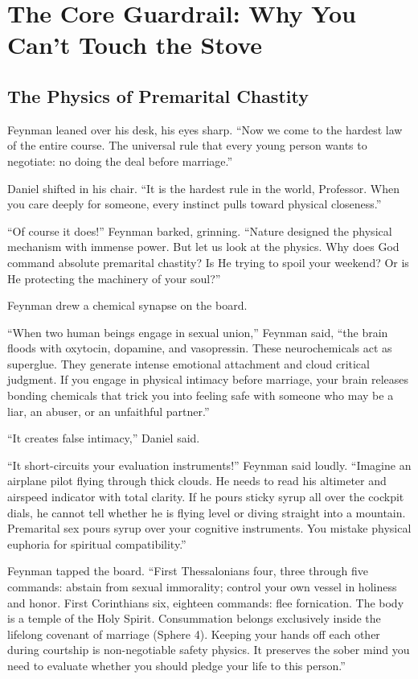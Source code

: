 \documentclass[11pt]{report}
\begin{document}
\chapter{The Core Guardrail: Why You Can't Touch the Stove}

\section{The Physics of Premarital Chastity}
Feynman leaned over his desk, his eyes sharp. ``Now we come to the hardest law of the entire course. The universal rule that every young person wants to negotiate: no doing the deal before marriage.''

Daniel shifted in his chair. ``It is the hardest rule in the world, Professor. When you care deeply for someone, every instinct pulls toward physical closeness.''

``Of course it does!'' Feynman barked, grinning. ``Nature designed the physical mechanism with immense power. But let us look at the physics. Why does God command absolute premarital chastity? Is He trying to spoil your weekend? Or is He protecting the machinery of your soul?''

Feynman drew a chemical synapse on the board.

``When two human beings engage in sexual union,'' Feynman said, ``the brain floods with oxytocin, dopamine, and vasopressin. These neurochemicals act as superglue. They generate intense emotional attachment and cloud critical judgment. If you engage in physical intimacy before marriage, your brain releases bonding chemicals that trick you into feeling safe with someone who may be a liar, an abuser, or an unfaithful partner.''

``It creates false intimacy,'' Daniel said.

``It short-circuits your evaluation instruments!'' Feynman said loudly. ``Imagine an airplane pilot flying through thick clouds. He needs to read his altimeter and airspeed indicator with total clarity. If he pours sticky syrup all over the cockpit dials, he cannot tell whether he is flying level or diving straight into a mountain. Premarital sex pours syrup over your cognitive instruments. You mistake physical euphoria for spiritual compatibility.''

Feynman tapped the board. ``First Thessalonians four, three through five commands: abstain from sexual immorality; control your own vessel in holiness and honor. First Corinthians six, eighteen commands: flee fornication. The body is a temple of the Holy Spirit. Consummation belongs exclusively inside the lifelong covenant of marriage (Sphere 4). Keeping your hands off each other during courtship is non-negotiable safety physics. It preserves the sober mind you need to evaluate whether you should pledge your life to this person.''
\end{document}
